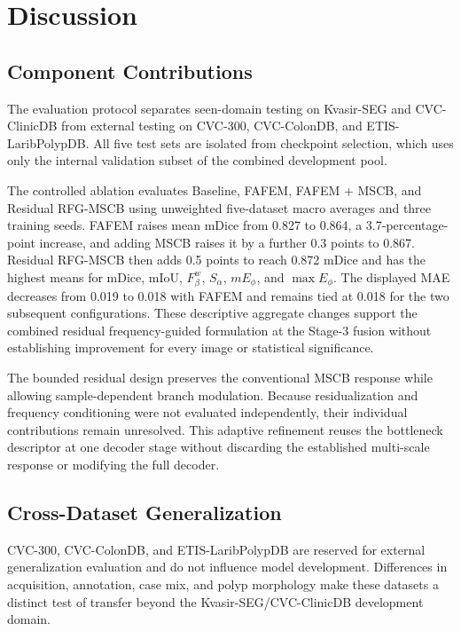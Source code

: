 \section{Discussion}\label{discussion}

\subsection{Component Contributions}

The evaluation protocol separates seen-domain testing on Kvasir-SEG and
CVC-ClinicDB from external testing on CVC-300, CVC-ColonDB, and
ETIS-LaribPolypDB. All five test sets are isolated from checkpoint selection, which
uses only the internal validation subset of the combined development pool.

The controlled ablation evaluates Baseline, FAFEM, FAFEM + MSCB, and Residual RFG-MSCB
using unweighted five-dataset macro averages and three training seeds. FAFEM
raises mean mDice from 0.827 to 0.864, a 3.7-percentage-point increase, and
adding MSCB raises it by a further 0.3 points to 0.867. Residual RFG-MSCB then
adds 0.5 points to reach 0.872 mDice and has the highest means for mDice, mIoU,
$F_{\beta}^{w}$, $S_{\alpha}$, $mE_{\phi}$, and $\max E_{\phi}$. The displayed
MAE decreases from 0.019 to 0.018 with FAFEM and remains tied at 0.018 for the
two subsequent configurations. These descriptive aggregate changes support the
combined residual frequency-guided formulation at the Stage-3 fusion without
establishing improvement for every image or statistical significance.

The bounded residual design preserves the conventional MSCB response while allowing
sample-dependent branch modulation. Because residualization and frequency conditioning
were not evaluated independently, their individual contributions remain unresolved.
This adaptive refinement reuses the bottleneck descriptor at one decoder stage without
discarding the established multi-scale response or modifying the full decoder.

\subsection{Cross-Dataset Generalization}

CVC-300, CVC-ColonDB, and ETIS-LaribPolypDB are reserved for external
generalization evaluation and do not influence model development. Differences in
acquisition, annotation, case mix, and polyp morphology make these datasets a distinct
test of transfer beyond the Kvasir-SEG/CVC-ClinicDB development domain.

